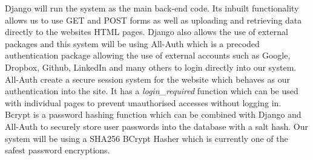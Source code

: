 \documentclass[../main.tex]{subfiles}
\begin{document}
\raggedright
Django will run the system as the main back-end code. Its inbuilt functionality allows us to use GET and POST forms as well as uploading and retrieving data directly to the websites HTML pages. Django also allows the use of external packages and this system will be using All-Auth\cite{allauth} which is a precoded authentication package allowing the use of external accounts such as Google, Dropbox, Github, LinkedIn and many others to login directly into our system. All-Auth create a secure session system for the website which behaves as our authentication into the site. It has a \textit{login\_required} function which can be used with individual pages to prevent unauthorised accesses without logging in. \\[4mm]

Bcrypt\cite{bcrypt} is a password hashing function which can be combined with Django and All-Auth to securely store user passwords into the database with a salt hash. Our system will be using a SHA256 BCrypt Hasher which is currently one of the safest password encryptions\cite{bcryptpower}. 
  
\end{document}

